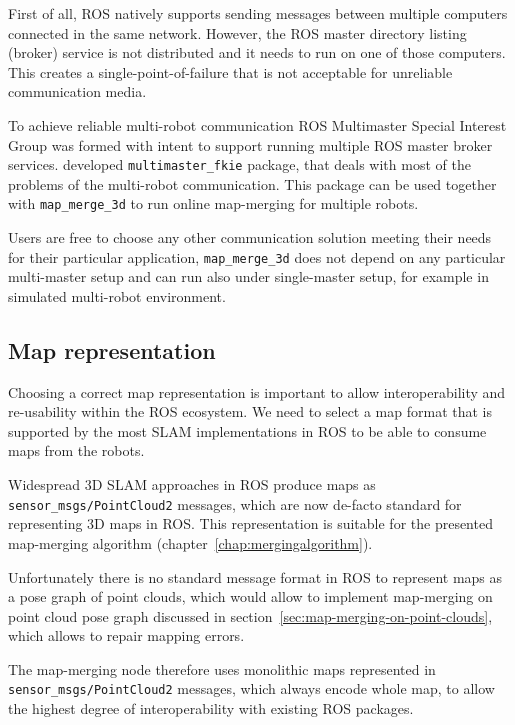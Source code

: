 First of all, \gls{ROS} natively supports sending messages between multiple computers connected in the same network. However, the \gls{ROS} master directory listing (broker) service is not distributed and it needs to run on one of those computers. This creates a single-point-of-failure that is not acceptable for unreliable communication media.

To achieve reliable multi-robot communication \gls{ROS} Multimaster Special Interest Group was formed with intent to support running multiple \gls{ROS} master broker services. \citet{hernadez2015multi} developed \texttt{multimaster\_fkie} package, that deals with most of the problems of the multi-robot communication. This package can be used together with \texttt{map\_merge\_3d} to run online map-merging for multiple robots.

Users are free to choose any other communication solution meeting their needs for their particular application, \texttt{map\_merge\_3d} does not depend on any particular multi-master setup and can run also under single-master setup, for example in simulated multi-robot environment.

\subsection{Map representation}
\label{sec:map-representation}

Choosing a correct map representation is important to allow interoperability and re-usability within the \gls{ROS} ecosystem. We need to select a map format that is supported by the most \gls{SLAM} implementations in \gls{ROS} to be able to consume maps from the robots.

Widespread \gls{3D} \gls{SLAM} approaches in \gls{ROS} produce maps as \texttt{sen\-sor\_msgs/\-Point\-Cloud2} messages, which are now de-facto standard for representing \gls{3D} maps in \gls{ROS}. This representation is suitable for the presented map-merging algorithm (chapter~\ref{chap:mergingalgorithm}).

Unfortunately there is no standard message format in \gls{ROS} to represent maps as a pose graph of point clouds, which would allow to implement map-merging on point cloud pose graph discussed in section~\ref{sec:map-merging-on-point-clouds}, which allows to repair mapping errors.

The map-merging node therefore uses monolithic maps represented in \texttt{sen\-sor\_msgs/\-Point\-Cloud2} messages, which always encode whole map, to allow the highest degree of interoperability with existing \gls{ROS} packages.

